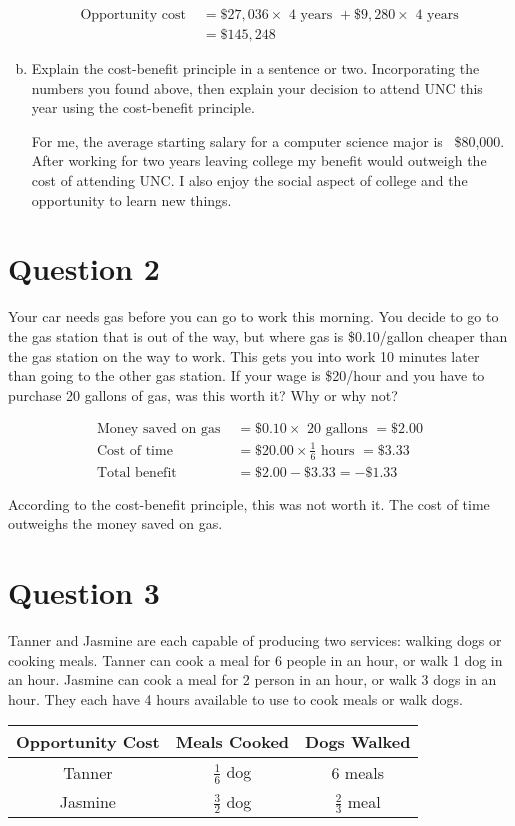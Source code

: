 \documentclass{article}
\newcommand{\question}[1]{\pagebreak\section{Question #1}}
\begin{document}
\begin{enumerate}[(a)]
    \begin{align*}
        \text{Opportunity cost } &= \$27,036 \times \text{ 4 years } + \$9,280 \times \text{ 4 years }\\
        &= \$145,248
    \end{align*}

    \item Explain the cost-benefit principle in a sentence or two. Incorporating the numbers you found above, then explain your decision
    to attend UNC this year using the cost-benefit principle.

    For me, the average starting salary for a computer science major is ~\$80,000. After working for two years leaving college my benefit would outweigh the cost of attending UNC. I also enjoy the social aspect of college and the opportunity to learn new things. 

\end{enumerate}

\question{2} Your car needs gas before you can go to work this morning. You
decide to go to the gas station that is out of the way, but where gas
is \$0.10/gallon cheaper than the gas station on the way to work. This
gets you into work 10 minutes later than going to the other gas station.
If your wage is \$20/hour and you have to purchase 20 gallons of gas,
was this worth it? Why or why not?

\begin{align*}
    \text{Money saved on gas } &= \$0.10 \times \text{ 20 gallons } = \$2.00\\
    \text{Cost of time } &= \$20.00 \times \frac{1}{6} \text{ hours } = \$3.33\\
    \text{Total benefit } &= \$2.00 - \$3.33 = -\$1.33
\end{align*}

According to the cost-benefit principle, this was not worth it. The cost of time outweighs the money saved on gas.

\question{3} Tanner and Jasmine are each capable of producing two services: walking dogs or cooking meals. Tanner can cook a meal for 6 people in
an hour, or walk 1 dog in an hour. Jasmine can cook a meal for 2
person in an hour, or walk 3 dogs in an hour. They each have 4 hours
available to use to cook meals or walk dogs.

\begin{center}
    \begin{tabular}{ |c|c|c| } 
     \hline
     Opportunity Cost & Meals Cooked & Dogs Walked \\ 
     \hline
    Tanner & \(\frac{1}{6}\) dog & 6 meals \\
    \hline
    Jasmine & \(\frac{3}{2}\) dog & \(\frac{2}{3}\) meal \\
    \hline
    \end{tabular}
\end{center}
\end{document}
